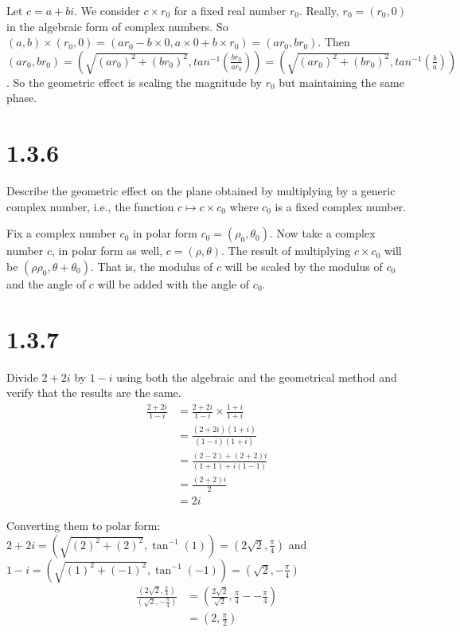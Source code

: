 \documentclass[11pt]{article}
\begin{document}
Let $c = a + bi$. We consider $c \times r_0$ for a fixed real number $r_0$. Really, $r_0 = (r_0, 0)$ in the algebraic form of complex numbers. 
So $(a,b)\times (r_0,0) = (ar_0 - b\times0 , a\times0 + b\times r_0) = (ar_0,br_0)$.
Then $(ar_0,br_0) = (\sqrt{(ar_0)^2+(br_0)^2}, tan^{-1}(\frac{br_0}{ar_0})) = (\sqrt{(ar_0)^2+(br_0)^2}, tan^{-1}(\frac{b}{a}))$.
So the geometric effect is scaling the magnitude by $r_0$ but maintaining the same phase. 


\section{1.3.6}
Describe the geometric effect on the plane obtained by multiplying by a generic complex number, i.e., the function $c \mapsto  c \times c_0$ where $c_0$ is a fixed complex number.

Fix a complex number $c_0$ in polar form $c_0 = (\rho_0,\theta_0)$. 
Now take a complex number $c$, in polar form as well, $c = (\rho,\theta)$. The result of multiplying $c\times c_0$ will be $(\rho\rho_0,\theta + \theta_0)$.
That is, the modulus of $c$ will be scaled by the modulus of $c_0$ and the angle of $c$ will be added with the angle of $c_0$. 


\section{1.3.7}
Divide $2 + 2i$ by $1 - i$ using both the algebraic and the geometrical method and verify that the results are the same. 
\begin{align*}
	\frac{2+2i}{1-i} &= \frac{2+2i}{1-i} \times \frac{1+i}{1+i} \\ 
			 &= \frac{(2+2i)(1+i)}{(1-i)(1+i)}\\
			 &= \frac{(2 - 2) + (2+2)i}{(1+1) + i(1-1)}\\
			 &= \frac{(2+2)i}{2}\\
			 &= 2i
\end{align*}

Converting them to polar form: \\
$2 + 2i = (\sqrt{(2)^2 + (2)^2}, \tan^{-1}(1)) = (2\sqrt{2}, \frac{\pi}{4})$ 
and $1 - i = (\sqrt{(1)^2 + (-1)^2}, \tan^{-1}(-1)) = (\sqrt{2}, -\frac{\pi}{4})$
\begin{align*}
	\frac{(2\sqrt{2}, \frac{\pi}{4})}{(\sqrt{2}, -\frac{\pi}{4})} &= (\frac{2\sqrt{2}}{\sqrt{2}} , \frac{\pi}{4} - -\frac{\pi}{4})\\
	          &= (2, \frac{\pi}{2}) \\
\end{align*}
\end{document}
